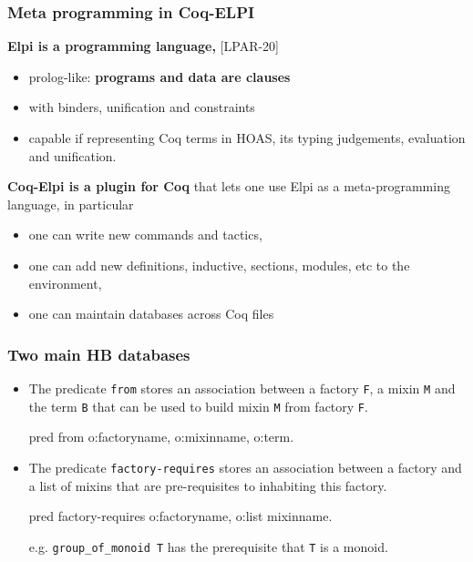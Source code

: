 \documentclass[11pt]{beamer}
\let\L=\lstinline
\begin{document}
\begin{frame}
  \frametitle{Meta programming in {\sc Coq-ELPI}}

  \textbf{{\sc Elpi} is a programming language,} \hfill [LPAR-20]
  \begin{itemize}
  \item prolog-like: \textbf{programs and data are clauses}
  \item with binders, unification and constraints
    \pause
  \item capable if representing {\sc Coq} terms in HOAS, its typing
    judgements, evaluation and unification.
  \end{itemize}
    \pause
    \vfill

  \textbf{{\sc Coq-Elpi} is a plugin for {\sc Coq}} that lets one use {\sc Elpi} as a
    meta-programming language, \pause in particular
  \begin{itemize}
  \item one can write new commands and tactics,
  \item one can add new definitions, inductive, sections, modules, etc
    to the environment,
  \item one can maintain databases across {\sc Coq} files
  \end{itemize}

\end{frame}

\begin{frame}[fragile]
  \frametitle{Two main HB databases}

  \begin{itemize}
  \item The predicate \L{from} stores an association between a factory
    \L{F}, a mixin \L{M} and the term \L{B} that can be used to build
    mixin \L{M} from factory \L{F}.
\begin{elpicode}
pred from o:factoryname, o:mixinname, o:term.
\end{elpicode}
\vfill
  \item The predicate {\footnotesize\tt factory-requires} stores an
    association between a factory and a list of mixins that are
    pre-requisites to inhabiting this factory.
\begin{elpicode}
pred factory-requires o:factoryname, o:list mixinname.
\end{elpicode}
    e.g. \L{group_of_monoid T} has the prerequisite that \L{T} is a
    monoid.
  \end{itemize}

\end{frame}
\end{document}
